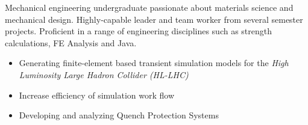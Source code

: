 \documentclass[10pt,a4paper]{altacv}
\begin{document}

\begin{fullwidth}
\makecvheader
\end{fullwidth} \vspace{-0.5cm}



Mechanical engineering undergraduate passionate about materials science and mechanical design. Highly-capable leader and team worker from several semester projects. Proficient in a range of engineering disciplines such as strength calculations, FE Analysis and Java.  


\begin{itemize}
\item Generating finite-element based transient simulation models for the \textit{High Luminosity Large Hadron Collider (HL-LHC)}
\item Increase efficiency of simulation work flow
\item Developing and analyzing Quench Protection Systems
\end{itemize}

\divider
\end{document}
